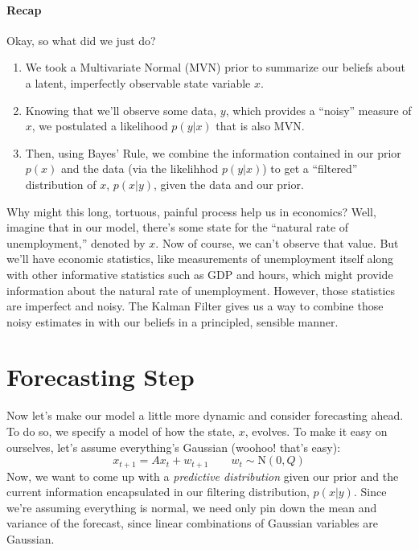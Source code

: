 \documentclass[a4paper,12pt]{article}
\begin{document}
\newpage
\paragraph{Recap} Okay, so what did we just do? 
\begin{enumerate} 
    \item We took a Multivariate Normal (MVN) prior to 
	summarize our beliefs about a latent, imperfectly 
    observable state variable $x$. 
    \item Knowing that we'll observe some data, $y$, which
	provides a ``noisy'' measure of $x$, we postulated a 
	likelihood $p(y|x)$ that is also MVN. 
    \item Then, using Bayes' Rule, we combine the information
	contained in our prior $p(x)$ and the data (via
	the likelihhod $p(y|x)$) to get a ``filtered'' 
	distribution of $x$, $p(x|y)$, given the data and our
	prior.
\end{enumerate} 
Why might this long, tortuous, painful process help us in
economics?  Well, imagine that in our model, there's some 
state for the ``natural rate of unemployment,'' denoted by $x$.  
Now of course, we can't observe that value.  But we'll have
economic statistics, like measurements of unemployment itself along 
with other informative statistics such as GDP
and hours, which might provide information about the natural
rate of unemployment.
However, those statistics are imperfect and noisy.  The
Kalman Filter gives us a way to combine those noisy estimates
in with our beliefs in a principled, sensible manner.


\section{Forecasting Step}

Now let's make our model a little more dynamic and consider 
forecasting ahead. To do so, we specify a model
of how the state, $x$, evolves.  To make it easy on ourselves,
let's assume everything's Gaussian (woohoo! that's easy):
\begin{equation}
    x_{t+1} = Ax_t + w_{t+1} \qquad w_t \sim \text{N}(0, Q)
\end{equation}
Now, we want to come up with a \emph{predictive distribution}
given our prior and the current information encapsulated in 
our filtering distribution, $p(x|y)$. Since we're assuming
everything is normal, we need only pin down the
mean and variance of the forecast, since linear combinations
of Gaussian variables are Gaussian.  
\end{document}
